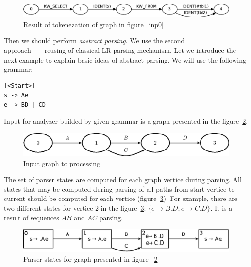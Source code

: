 \documentclass{sigplanconf}
\begin{document}
\begin{figure}[h!]
    \begin{center}
        \includegraphics[scale=0.3]{Graphs/simple_sql.eps}
    \end{center}
    \caption{Result of tokenezation of graph in figure~\ref{inp0}}
    \label{inp0tok}
\end{figure}

Then we should perform {\it abstract parsing}. We use the second approach~---~reusing of classical LR parsing mechanism. Let we introduce the next example to explain basic ideas of abstract parsing. We will use the following grammar:

\begin{verbatim}
[<Start>]
s -> Ae
e -> BD | CD
\end{verbatim}

Input for analyzer builded by given grammar is a graph presented in the figure~\ref{inp1}.

\begin{figure}[h!]
    \begin{center}
        \includegraphics[scale=0.5]{Graphs/simple_grammar_input.eps}
    \end{center}
    \caption{Input graph to processing}
    \label{inp1}
\end{figure}

The set of parser states are computed for each graph vertice during parsing. All states that may be computed during parsing of all paths from start vertice to current should be computed for each vertice (figure~\ref{states}). For example, there are two different states for vertice 2 in the figure~\ref{states}: $\{e \to B.D; e \to C.D\}$. It is a result of sequences $AB$ and $AC$ parsing. 

\begin{figure}[h!]
    \begin{center}
        \includegraphics[scale=0.5]{Graphs/simple_grammar_items.eps}
    \end{center}
    \caption{Parser states for graph presented in figure ~\ref{inp1}}
    \label{states}
\end{figure}
\end{document}
